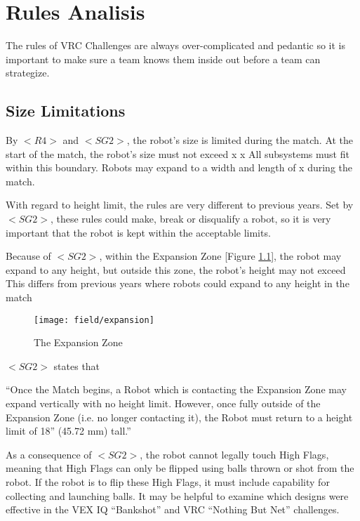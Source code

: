 \documentclass[../main.tex]{subfiles}
\begin{document}
\chapter{Rules Analisis}

The rules of VRC Challenges are always over-complicated and pedantic
so it is important to make sure a team knows them inside out before a team can
strategize.

\section{Size Limitations}

By $<R4>$ and $<SG2>$, the robot’s size is limited during the match. 
At the start of the match, the robot’s size must not exceed  x  x  
All subsystems must fit within this boundary.
Robots may expand to a width and length of  x  during the match. \par

With regard to height limit, the rules are very different to previous years.
Set by $<SG2>$, these rules could make, break or disqualify a robot,
so it is very important that the robot is kept within the acceptable limits. \par

Because of $<SG2>$, within the Expansion Zone [Figure \ref{fig:expansionzone}], the robot may expand to any height,
but outside this zone, the robot’s height may not exceed  
This differs from previous years where robots could expand to any height in the match 
\par

\begin{figure}
    \texttt{[image: field/expansion]}
    \caption{The Expansion Zone}
   \label{fig:expansionzone}
\end{figure}

$<SG2>$ states that

``Once the Match begins, a Robot which is contacting the Expansion Zone 
may expand vertically with no height limit. However, once fully outside of the 
Expansion Zone 
(i.e. no longer contacting it), the Robot
must return to a height limit of 18” (45.72 mm) tall.''
\par

As a consequence of $<SG2>$,
the robot cannot legally touch High Flags, meaning that High Flags can only be
flipped using balls thrown or shot from the robot. If the robot is to flip these
High Flags, it must include capability for collecting and launching balls.
It may be helpful to examine which designs were effective in the VEX IQ
“Bankshot” and VRC “Nothing But Net” challenges.
\end{document}
